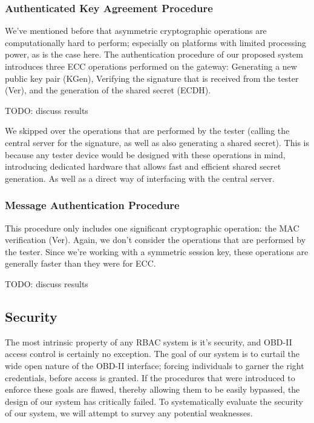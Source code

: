 \subsubsection{Authenticated Key Agreement Procedure}
\label{subsec:speed1}

We've mentioned before that asymmetric cryptographic operations are computationally hard to perform; especially on platforms with limited processing power, as is the case here. The authentication procedure of our proposed system introduces three ECC operations performed on the gateway: Generating a new public key pair (KGen), Verifying the signature that is received from the tester (Ver), and the generation of the shared secret (ECDH).

TODO: discuss results

We skipped over the operations that are performed by the tester (calling the central server for the signature, as well as also generating a shared secret). This is because any tester device would be designed with these operations in mind, introducing dedicated hardware that allows fast and efficient shared secret generation. As well as a direct way of interfacing with the central server. 

\subsubsection{Message Authentication Procedure}
\label{subsec:speed2}

This procedure only includes one significant cryptographic operation: the MAC verification (Ver). Again, we don't consider the operations that are performed by the tester. Since we're working with a symmetric session key, these operations are generally faster than they were for ECC.

TODO: discuss results

\subsection{Security}
\label{sec:security}

The most intrinsic property of any RBAC system is it's security, and OBD-II access control is certainly no exception. The goal of our system is to curtail the wide open nature of the OBD-II interface; forcing individuals to garner the right credentials, before access is granted. If the procedures that were introduced to enforce these goals are flawed, thereby allowing them to be easily bypassed, the design of our system has critically failed. To systematically evaluate the security of our system, we will attempt to survey any potential weaknesses.


